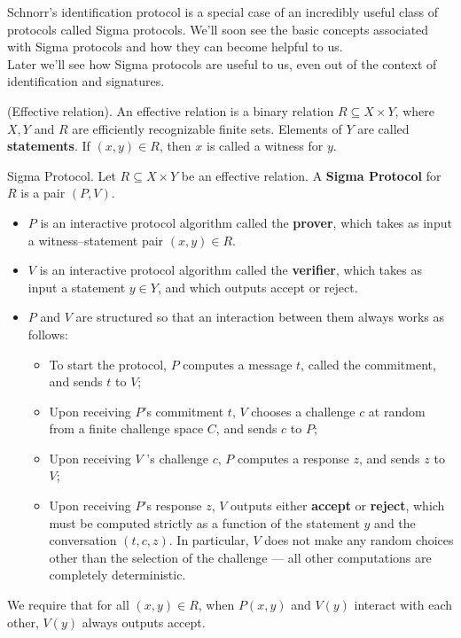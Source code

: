 Schnorr\textquoteright s identification protocol is a special case
of an incredibly useful class of protocols called Sigma protocols.
We'll soon see the basic concepts associated with Sigma protocols
and how they can become helpful to us.\\
Later we'll see how Sigma protocols are useful to us, even out of
the context of identification and signatures.
\begin{definition}
(Effective relation). An effective relation is a binary relation $R\subseteq X\times Y$,
where $X,Y$ and $R$ are efficiently recognizable finite sets. Elements
of $Y$ are called \textbf{statements}. If $\left(x,y\right)\in R$,
then $x$ is called a witness for $y$.
\end{definition}

\begin{definition}
Sigma Protocol. Let $R\subseteq X\times Y$ be an effective relation.
A \textbf{Sigma Protocol }for $R$ is a pair $\left(P,V\right)$.
\begin{itemize}
\item $P$ is an interactive protocol algorithm called the \textbf{prover},
which takes as input a witness--statement pair $\left(x,y\right)\in R$.
\item $V$ is an interactive protocol algorithm called the \textbf{verifier},
which takes as input a statement $y\in Y$, and which outputs accept
or reject.
\item $P$ and $V$ are structured so that an interaction between them always
works as follows:
\begin{itemize}
\item To start the protocol, $P$ computes a message $t$, called the commitment,
and sends $t$ to $V$;
\item Upon receiving $P$\textquoteright s commitment $t$, $V$ chooses
a challenge $c$ at random from a finite challenge space $C$, and
sends $c$ to $P$;
\item Upon receiving $V$ \textquoteright s challenge $c$, $P$ computes
a response $z$, and sends $z$ to $V$;
\item Upon receiving $P$\textquoteright s response $z$, $V$ outputs either
\textbf{accept} or \textbf{reject}, which must be computed strictly
as a function of the statement $y$ and the conversation $\left(t,c,z\right)$.
In particular, $V$ does not make any random choices other than the
selection of the challenge --- all other computations are completely
deterministic.
\end{itemize}
\end{itemize}
We require that for all $\left(x,y\right)\in R$, when $P\left(x,y\right)$
and $V\left(y\right)$ interact with each other, $V\left(y\right)$
always outputs accept.
\end{definition}

